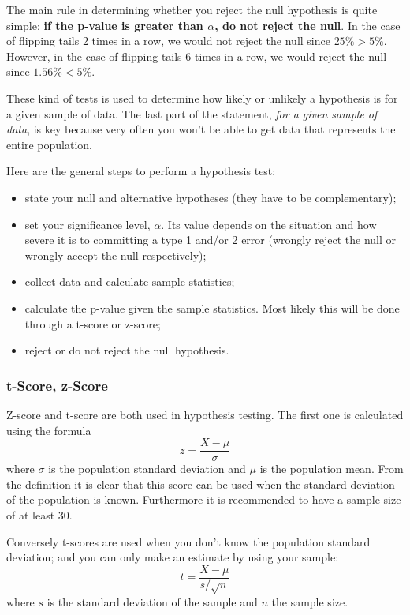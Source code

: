The main rule in determining whether you reject the null hypothesis is quite simple: \textbf{if the p-value is greater than \(\alpha\), do not reject the null}. In the case of flipping tails 2 times in a row, we would not reject the null since \(25\% > 5\%\). However, in the case of flipping tails 6 times in a row, we would reject the null since \(1.56\% < 5\%\).

These kind of tests is used to determine how likely or unlikely a hypothesis is for a given sample of data. The last part of the
statement, \emph{for a given sample of data}, is key because very often you won't be able to get data that represents the entire population.

Here are the general steps to perform a hypothesis test:

\begin{itemize}
\tightlist
\item
  state your null and alternative hypotheses (they have to be complementary);
\item
  set your significance level, \(\alpha\). Its value depends on the situation and how severe it is to committing a type 1 and/or 2 error (wrongly reject the null or wrongly accept the null respectively);
\item
  collect data and calculate sample statistics;
\item
  calculate the p-value given the sample statistics. Most likely this will be done through a t-score or z-score;
\item
  reject or do not reject the null hypothesis.
\end{itemize}

\subsubsection{t-Score, z-Score}\label{t-score-z-score}

Z-score and t-score are both used in hypothesis testing. The first one is calculated using the formula 
\begin{equation}
z = \frac{X-\mu}{\sigma}
\end{equation} 
where \(\sigma\) is the population standard deviation and \(\mu\) is the population mean. From the definition it is clear that this score can be used when the standard deviation of the population is known. Furthermore it is recommended to have a sample size of at least 30.

Conversely t-scores are used when you don't know the population standard deviation; and you can only make an estimate by using your sample:
\begin{equation}
t = \frac{X - \mu}{s/\sqrt{n}}
\end{equation} 
where \(s\) is the standard deviation of the sample and \(n\) the sample size.


